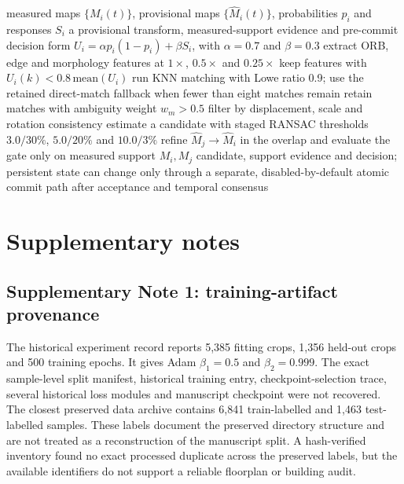 \documentclass[11pt]{article}
\begin{document}
\begin{algorithm}[H]
  \caption{Predictive map-registration proposal}
  \begin{algorithmic}[1]
    \REQUIRE measured maps $\{M_i(t)\}$, provisional maps $\{\widehat M_i(t)\}$, probabilities $p_i$ and responses $S_i$
    \ENSURE a provisional transform, measured-support evidence and pre-commit decision
    \STATE form $U_i=\alpha p_i(1-p_i)+\beta S_i$, with $\alpha=0.7$ and $\beta=0.3$
    \STATE extract ORB, edge and morphology features at $1\times$, $0.5\times$ and $0.25\times$
    \STATE keep features with $U_i(k)<0.8\,\mathrm{mean}(U_i)$
    \STATE run KNN matching with Lowe ratio 0.9; use the retained direct-match fallback when fewer than eight matches remain
    \STATE retain matches with ambiguity weight $w_m>0.5$
    \STATE filter by displacement, scale and rotation consistency
    \STATE estimate a candidate with staged RANSAC thresholds $3.0/30\%$, $5.0/20\%$ and $10.0/3\%$
    \STATE refine $\widehat M_j\!\rightarrow\!\widehat M_i$ in the overlap and evaluate the gate only on measured support $M_i,M_j$
    \RETURN candidate, support evidence and decision; persistent state can change only through a separate, disabled-by-default atomic commit path after acceptance and temporal consensus
  \end{algorithmic}
\end{algorithm}
\enlargethispage{4\baselineskip}

\vspace{-0.45em}
\section*{Supplementary notes}
\vspace{-0.45em}

\subsection*{Supplementary Note 1: training-artifact provenance}
\vspace{-0.25em}
The historical experiment record reports 5{,}385 fitting crops, 1{,}356 held-out crops and 500 training epochs. It gives Adam $\beta_1=0.5$ and $\beta_2=0.999$. The exact sample-level split manifest, historical training entry, checkpoint-selection trace, several historical loss modules and manuscript checkpoint were not recovered. The closest preserved data archive contains 6{,}841 train-labelled and 1{,}463 test-labelled samples. These labels document the preserved directory structure and are not treated as a reconstruction of the manuscript split. A hash-verified inventory found no exact processed duplicate across the preserved labels, but the available identifiers do not support a reliable floorplan or building audit.
\end{document}
